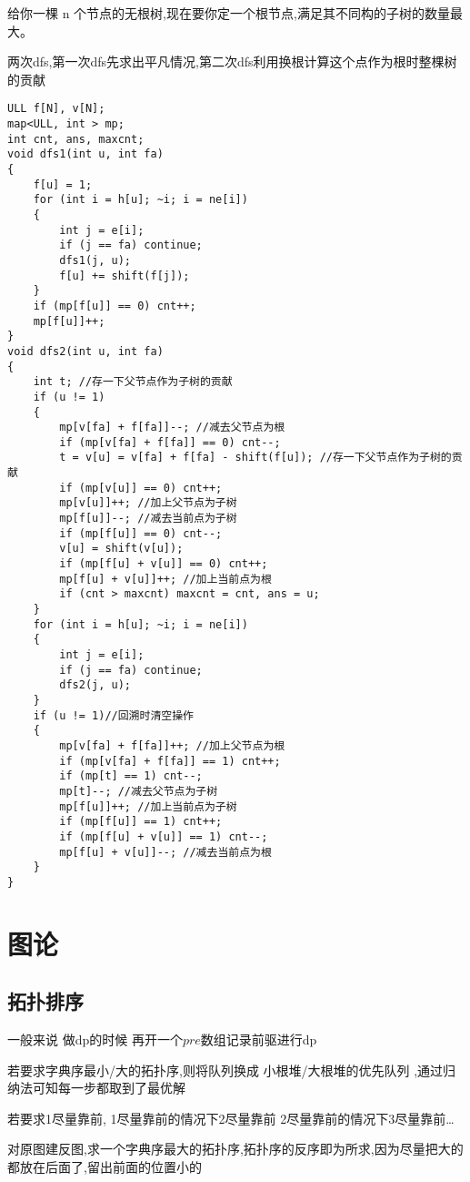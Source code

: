 \documentclass[a4paper, fontset=none]{ctexart}
\begin{document}
给你一棵 n 个节点的无根树,现在要你定一个根节点,满足其不同构的子树的数量最大。

两次dfs,第一次dfs先求出平凡情况,第二次dfs利用换根计算这个点作为根时整棵树的贡献

\begin{verbatim}
ULL f[N], v[N];
map<ULL, int > mp;
int cnt, ans, maxcnt;
void dfs1(int u, int fa)
{
    f[u] = 1;
    for (int i = h[u]; ~i; i = ne[i])
    {
        int j = e[i];
        if (j == fa) continue;
        dfs1(j, u);
        f[u] += shift(f[j]);
    }
    if (mp[f[u]] == 0) cnt++;
    mp[f[u]]++;
}
void dfs2(int u, int fa)
{
    int t; //存一下父节点作为子树的贡献
    if (u != 1)
    {
        mp[v[fa] + f[fa]]--; //减去父节点为根
        if (mp[v[fa] + f[fa]] == 0) cnt--;
        t = v[u] = v[fa] + f[fa] - shift(f[u]); //存一下父节点作为子树的贡献
        if (mp[v[u]] == 0) cnt++;
        mp[v[u]]++; //加上父节点为子树
        mp[f[u]]--; //减去当前点为子树
        if (mp[f[u]] == 0) cnt--;
        v[u] = shift(v[u]);
        if (mp[f[u] + v[u]] == 0) cnt++;
        mp[f[u] + v[u]]++; //加上当前点为根
        if (cnt > maxcnt) maxcnt = cnt, ans = u;
    }
    for (int i = h[u]; ~i; i = ne[i])
    {
        int j = e[i];
        if (j == fa) continue;
        dfs2(j, u);
    }
    if (u != 1)//回溯时清空操作
    {
        mp[v[fa] + f[fa]]++; //加上父节点为根
        if (mp[v[fa] + f[fa]] == 1) cnt++;
        if (mp[t] == 1) cnt--;
        mp[t]--; //减去父节点为子树
        mp[f[u]]++; //加上当前点为子树
        if (mp[f[u]] == 1) cnt++;
        if (mp[f[u] + v[u]] == 1) cnt--;
        mp[f[u] + v[u]]--; //减去当前点为根
    }
}
\end{verbatim}

\section{图论}
\subsection{拓扑排序}
一般来说 做dp的时候 再开一个$pre$数组记录前驱进行dp

若要求字典序最小/大的拓扑序,则将队列换成 小根堆/大根堆的优先队列 ,通过归纳法可知每一步都取到了最优解

若要求1尽量靠前, 1尽量靠前的情况下2尽量靠前  2尽量靠前的情况下3尽量靠前\ldots{}

对原图建反图,求一个字典序最大的拓扑序,拓扑序的反序即为所求,因为尽量把大的都放在后面了,留出前面的位置小的
\end{document}
